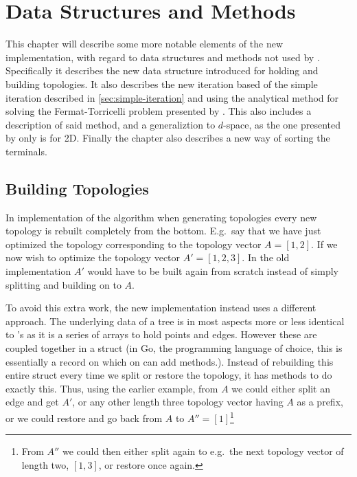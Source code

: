  {
\abnormalparskip{0pt}
\chapter{Data Structures and Methods}
\label{cha:data-structures}
}

This chapter will describe some more notable elements of the new implementation,
with regard to data structures and methods not used by
\textcite{smith1992}. Specifically it describes the new data structure
introduced for holding and building topologies. It also describes the new
iteration based of the simple iteration described in \cref{sec:simple-iteration}
and using the analytical method for solving the Fermat-Torricelli problem
presented by \textcite{uteshev2014}. This also includes a description of said
method, and a generaliztion to $d$-space, as the one presented by
\textcite{uteshev2014} only is for 2D. Finally the chapter also describes a new
way of sorting the terminals.

\section{Building Topologies}
\label{sec:building-topologies}

In \textcite{smith1992} implementation of the algorithm when generating
topologies every new topology is rebuilt completely from the bottom. E.g.\ say
that we have just optimized the topology corresponding to the topology vector
$A = [1, 2]$. If we now wish to optimize the topology vector
$A' = [1, 2, 3]$. In the old implementation $A'$ would have to be built again
from scratch instead of simply splitting and building on to $A$.

To avoid this extra work, the new implementation instead uses a different
approach. The underlying data of a tree is in most aspects more or less
identical to \citeauthor{smith1992}'s as it is a series of arrays to hold points
and edges. However these are coupled together in a struct (in Go, the
programming language of choice, this is essentially a record on which on can add
methods.). Instead of rebuilding this entire struct every time we split or
restore the topology, it has methods to do exactly this. Thus, using the earlier
example, from $A$ we could either split an
edge and get $A'$, or any other length three topology vector having $A$ as a
prefix, or we could restore and go back from $A$ to $A'' = [1]$\footnote{From
  $A''$ we could then either split again to e.g.\ the next topology vector of
  length two, $[1, 3]$, or restore once again.}

